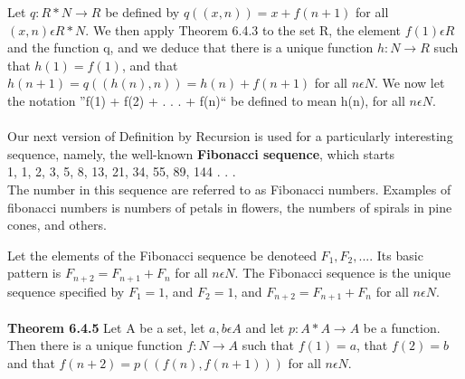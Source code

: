 \documentclass[a4paper,10pt]{report}
\begin{document}
Let $q : R * N \rightarrow R$ be defined by $q((x, n)) = x + f (n + 1)$ for all $(x, n) \epsilon R * N$. We then apply Theorem 6.4.3 to the set R, the element $f(1)\epsilon R$ and the function q, and we deduce that there is a unique function $h : N \rightarrow R$ such that $h(1) = f(1)$, and that $h(n + 1) = q((h(n), n)) = h(n) + f (n + 1)$ for all $n\epsilon N$. We now let the notation ''f(1) + f(2) + . . . + f(n)`` be defined to mean h(n), for all $n\epsilon N$.
\\
\\
Our next version of Definition by Recursion is used for a particularly interesting sequence, namely, the well-known {\bf Fibonacci sequence}, which starts \\1, 1, 2, 3, 5, 8, 13, 21, 34, 55, 89, 144 . . .\\ The number in this sequence are referred to as Fibonacci numbers. Examples of fibonacci numbers is numbers of petals in flowers, the numbers of spirals in pine cones, and others.

Let the elements of the Fibonacci sequence be denoteed $F_1, F_2, . . . .$ Its basic pattern is $F_{n+2}=F_{n+1}+F_n$ for all $n\epsilon N$. The Fibonacci sequence is the unique sequence specified by $F_1=1$, and $F_2=1$, and $F_{n+2}=F_{n+1}+F_n$ for all $n\epsilon N$.
\\\\
{\bf Theorem 6.4.5} Let A be a set, let $a, b \epsilon A$ and let $p : A * A \rightarrow A$ be a function. Then there is a unique function $f : N \rightarrow A$ such that $f (1) = a$, that $f (2) = b$ and that $f (n + 2) = p(( f (n), f (n + 1)))$ for all $n \epsilon N$. 
\end{document}
